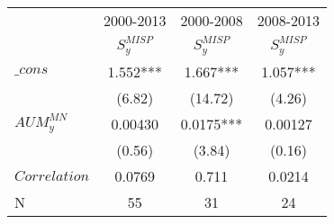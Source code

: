 \begin{tabular}{lccc}
\toprule
      & \multicolumn{1}{l}{2000-2013} & \multicolumn{1}{l}{2000-2008} & \multicolumn{1}{l}{2008-2013} \\
      & $S^{MISP}_y$ & $S^{MISP}_y$ & $S^{MISP}_y$ \\
\midrule
$\_cons$ & 1.552*** & 1.667*** & 1.057*** \\
      & (6.82) & (14.72) & (4.26) \\
$AUM^{MN}_y$ & 0.00430 & 0.0175*** & 0.00127 \\
      & (0.56) & (3.84) & (0.16) \\
\midrule
$Correlation$ & 0.0769 & 0.711 & 0.0214 \\
N     & 55    & 31    & 24 \\
\bottomrule
\end{tabular}%
